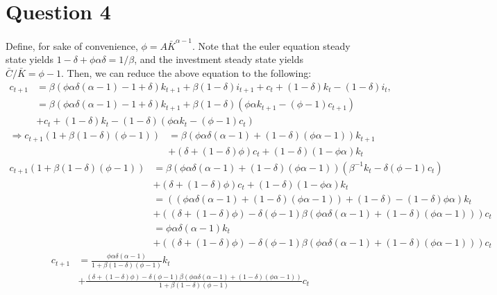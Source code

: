 \documentclass[11pt]{article} %
\begin{document}
\section{Question 4}
Define, for sake of convenience, $ \phi = A\bar{K}^{\alpha - 1}$. Note that the euler equation steady state yields $1-\delta + \phi \alpha \delta = 1/\beta$, and the investment steady state yields $\bar{C}/\bar{K} = \phi - 1$. Then, we can reduce the above equation to the following:
\begin{align*}
c_{t+1} &= \beta( \phi \alpha \delta (\alpha - 1) - 1+\delta)k_{t+1} + \beta(1-\delta) i_{t+1} + c_t + (1-\delta) k_t - (1-\delta) i_t,\\
&= \beta(\phi \alpha \delta  (\alpha - 1) - 1+\delta)k_{t+1} + \beta(1-\delta)\left(\phi \alpha k_{t+1} - (\phi - 1)c_{t+1} \right)  \\&+ c_t + (1-\delta) k_t - (1-\delta) \left( \phi \alpha k_t - (\phi - 1)c_t \right)
\end{align*}
\begin{align*}
\Rightarrow c_{t+1}\left( 1 + \beta(1-\delta) (\phi - 1)\right) &=  \beta(\phi \alpha \delta  (\alpha - 1) + (1-\delta)(\phi \alpha - 1))k_{t+1}   \\&+(\delta  +(1-\delta) \phi) c_t +  (1-\delta)\left( 1-\phi \alpha \right)k_t 
\end{align*}
\begin{align*}
c_{t+1}\left( 1 + \beta(1-\delta) (\phi - 1)\right)  &=  \beta(\phi \alpha \delta  (\alpha - 1) + (1-\delta)(\phi \alpha  - 1))\left( \beta^{-1}k_t - \delta(\phi - 1)c_t \right)\\ &+(\delta  +(1-\delta) \phi) c_t +  (1-\delta)\left( 1-\phi \alpha  \right)k_t \\
&= ((\phi \alpha \delta  (\alpha - 1) + (1-\delta)(\phi \alpha  - 1)) + (1-\delta) - (1-\delta)\phi\alpha)k_t \\&+ ((\delta  +(1-\delta) \phi) - \delta(\phi - 1)\beta (\phi \alpha \delta  (\alpha - 1) + (1-\delta)(\phi \alpha  - 1)))c_t\\
&= \phi \alpha \delta (\alpha - 1)k_t \\&+ ((\delta  +(1-\delta) \phi)- \delta(\phi - 1)\beta (\phi \alpha \delta  (\alpha - 1) + (1-\delta)(\phi \alpha  - 1)))c_t
\end{align*}
\begin{align*}
c_{t+1} &= \frac{\phi \alpha \delta (\alpha - 1)}{1 + \beta(1-\delta) (\phi - 1)}k_{t}\\ &+ \frac{(\delta  +(1-\delta) \phi) - \delta(\phi - 1)\beta (\phi \alpha \delta  (\alpha - 1) + (1-\delta)(\phi \alpha  - 1))}{1 + \beta(1-\delta) (\phi - 1)}c_t
\end{align*}
\end{document}
